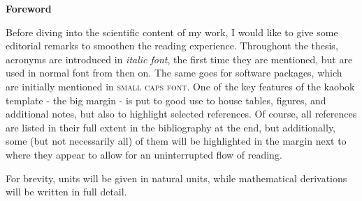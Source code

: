 
\thispagestyle{plain}
\begin{minipage}[c][0.4\textheight][b]{0.9\textwidth}
    \huge
    \textbf{Foreword}
    \normalsize
    \par
    \vspace{1.0cm}
    Before diving into the scientific content of my work, I would like to give some editorial remarks to smoothen the reading experience. Throughout the thesis, acronyms are introduced in \textit{italic font}, the first time they are mentioned, but are used in normal font from then on. The same goes for software packages, which are initially mentioned in \textsc{small caps font}. One of the key features of the kaobok template - the big margin - is put to good use to house tables, figures, and additional notes, but also to highlight selected references. Of course, all references are listed in their full extent in the bibliography at the end, but additionally, some (but not necessarily all) of them will be highlighted in the margin next to where they appear to allow for an uninterrupted flow of reading.
    
    For brevity, units will be given in natural units, while mathematical derivations will be written in full detail.
\end{minipage}
